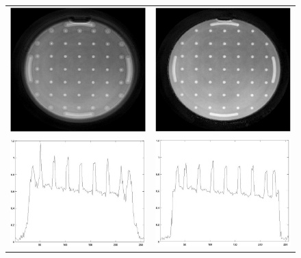 \documentclass[journal]{IEEEtran}
\numberwithin{equation}{section}
\numberwithin{table}{section}
\numberwithin{figure}{section}
\begin{document}
\begin{figure}[ht] 
\centering
\begin{tabular}{cc}
\includegraphics[width=8cm]{pics/reallife_600_gridding_iter=1.jpg} &
\includegraphics[width=8cm]{pics/reallife_600_iter=1.jpg}\\
\includegraphics[width=8cm]{pics/reallife_600_gridding_iter=1row.jpg} &
\includegraphics[width=8cm]{pics/reallife_600_iter=1row.jpg}

\end{tabular}
\end{figure}
\end{document}

